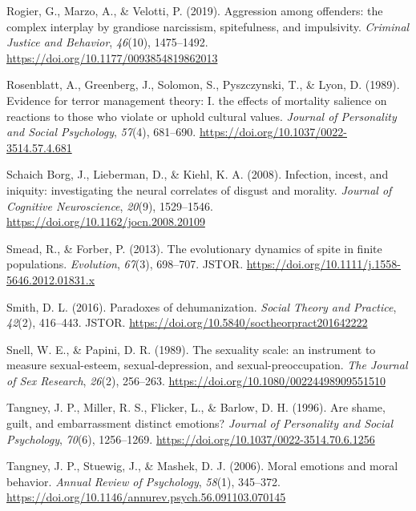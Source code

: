 \documentclass[
  english,
  donotrepeattitle,doc, 12pt, a4paper,floatsintext]{apa7}
\newlength{\cslhangindent}
\newlength{\cslentryspacingunit} %
\newenvironment{CSLReferences}[2] %
 {%
  \setlength{\parindent}{0pt}
  \ifodd #1
  \let\oldpar\par
  \def\par{\hangindent=\cslhangindent\oldpar}
  \fi
  \setlength{\parskip}{#2\cslentryspacingunit}
 }%
 {}
\begin{document}
\begin{CSLReferences}{1}{0}
\leavevmode{}%
Rogier, G., Marzo, A., \& Velotti, P. (2019). Aggression among offenders: the complex interplay by grandiose narcissism, spitefulness, and impulsivity. \emph{Criminal Justice and Behavior}, \emph{46}(10), 1475--1492. \url{https://doi.org/10.1177/0093854819862013}

\leavevmode{}%
Rosenblatt, A., Greenberg, J., Solomon, S., Pyszczynski, T., \& Lyon, D. (1989). Evidence for terror management theory: I. the effects of mortality salience on reactions to those who violate or uphold cultural values. \emph{Journal of Personality and Social Psychology}, \emph{57}(4), 681--690. \url{https://doi.org/10.1037/0022-3514.57.4.681}

\leavevmode{}%
Schaich Borg, J., Lieberman, D., \& Kiehl, K. A. (2008). Infection, incest, and iniquity: investigating the neural correlates of disgust and morality. \emph{Journal of Cognitive Neuroscience}, \emph{20}(9), 1529--1546. \url{https://doi.org/10.1162/jocn.2008.20109}

\leavevmode{}%
Smead, R., \& Forber, P. (2013). The evolutionary dynamics of spite in finite populations. \emph{Evolution}, \emph{67}(3), 698--707. JSTOR. \url{https://doi.org/10.1111/j.1558-5646.2012.01831.x}

\leavevmode{}%
Smith, D. L. (2016). Paradoxes of dehumanization. \emph{Social Theory and Practice}, \emph{42}(2), 416--443. JSTOR. \url{https://doi.org/10.5840/soctheorpract201642222}

\leavevmode{}%
Snell, W. E., \& Papini, D. R. (1989). The sexuality scale: an instrument to measure sexual-esteem, sexual-depression, and sexual-preoccupation. \emph{The Journal of Sex Research}, \emph{26}(2), 256--263. \url{https://doi.org/10.1080/00224498909551510}

\leavevmode{}%
Tangney, J. P., Miller, R. S., Flicker, L., \& Barlow, D. H. (1996). Are shame, guilt, and embarrassment distinct emotions? \emph{Journal of Personality and Social Psychology}, \emph{70}(6), 1256--1269. \url{https://doi.org/10.1037/0022-3514.70.6.1256}

\leavevmode{}%
Tangney, J. P., Stuewig, J., \& Mashek, D. J. (2006). Moral emotions and moral behavior. \emph{Annual Review of Psychology}, \emph{58}(1), 345--372. \url{https://doi.org/10.1146/annurev.psych.56.091103.070145}


\end{CSLReferences}
\end{document}
